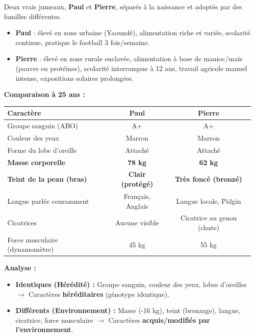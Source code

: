 \documentclass[11pt]{article}
\begin{document}
\begin{exemplebox}
Deux vrais jumeaux, \textbf{Paul} et \textbf{Pierre}, séparés à la naissance et adoptés par des familles différentes.
\begin{itemize}
    \item \textbf{Paul} : élevé en zone urbaine (Yaoundé), alimentation riche et variée, scolarité continue, pratique le football 3 fois/semaine.
    \item \textbf{Pierre} : élevé en zone rurale enclavée, alimentation à base de manioc/maïs (pauvre en protéines), scolarité interrompue à 12 ans, travail agricole manuel intense, expositions solaires prolongées.
\end{itemize}
\par\textbf{Comparaison à 25 ans :}
\begin{center}
\begin{tabular}{|l|c|c|}\hline
\textbf{Caractère} & \textbf{Paul} & \textbf{Pierre} \\ \hline
Groupe sanguin (ABO) & A+ & A+ \\ \hline
Couleur des yeux & Marron & Marron \\ \hline
Forme du lobe d'oreille & Attaché & Attaché \\ \hline
\textbf{Masse corporelle} & \textbf{78 kg} & \textbf{62 kg} \\ \hline
\textbf{Teint de la peau (bras)} & \textbf{Clair (protégé)} & \textbf{Très foncé (bronzé)} \\ \hline
Langue parlée couramment & Français, Anglais & Langue locale, Pidgin \\ \hline
Cicatrices & Aucune visible & Cicatrice au genou (chute) \\ \hline
Force musculaire (dynamomètre) & 45 kg & 55 kg \\ \hline
\end{tabular}
\end{center}
\par\textbf{Analyse :}
\begin{itemize}
    \item \textbf{Identiques (Hérédité) :} Groupe sanguin, couleur des yeux, lobes d'oreilles $\rightarrow$ Caractères \textbf{héréditaires} (génotype identique).
    \item \textbf{Différents (Environnement) :} Masse (-16 kg), teint (bronzage), langue, cicatrice, force musculaire $\rightarrow$ Caractères \textbf{acquis/modifiés par l'environnement}.
\end{itemize}
\end{exemplebox}
\end{document}
